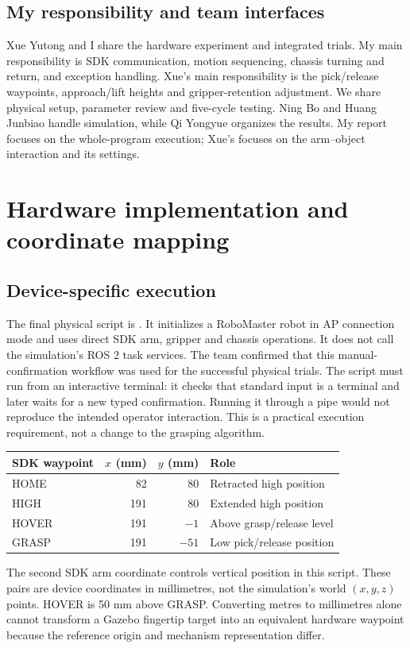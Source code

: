 
\newcommand{\studentname}{Bao Lintai}
\newcommand{\studentcn}{包林泰}
\newcommand{\studentid}{24020036004}

\commonrequirements
\subsection{My responsibility and team interfaces}
Xue Yutong and I share the hardware experiment and integrated trials. My main responsibility is SDK communication, motion sequencing, chassis turning and return, and exception handling. Xue's main responsibility is the pick/release waypoints, approach/lift heights and gripper-retention adjustment. We share physical setup, parameter review and five-cycle testing. Ning Bo and Huang Junbiao handle simulation, while Qi Yongyue organizes the results. My report focuses on the whole-program execution; Xue's focuses on the arm--object interaction and its settings.
\teamtable
\commonlimits
\clearpage
\section{Hardware implementation and coordinate mapping}
\subsection{Device-specific execution}
The final physical script is . It initializes a RoboMaster robot in AP connection mode and uses direct SDK arm, gripper and chassis operations. It does not call the simulation's ROS 2 task services. The team confirmed that this manual-confirmation workflow was used for the successful physical trials.
The script must run from an interactive terminal: it checks that standard input is a terminal and later waits for a new typed confirmation. Running it through a pipe would not reproduce the intended operator interaction. This is a practical execution requirement, not a change to the grasping algorithm.
\begin{center}
\begin{tabular}{@{}lrrl@{}}\toprule
SDK waypoint & $x$ (mm) & $y$ (mm) & Role\\\midrule
HOME & 82 & 80 & Retracted high position\\
HIGH & 191 & 80 & Extended high position\\
HOVER & 191 & $-1$ & Above grasp/release level\\
GRASP & 191 & $-51$ & Low pick/release position\\\bottomrule
\end{tabular}
\end{center}
The second SDK arm coordinate controls vertical position in this script. These pairs are device coordinates in millimetres, not the simulation's world $(x,y,z)$ points. HOVER is 50 mm above GRASP. Converting metres to millimetres alone cannot transform a Gazebo fingertip target into an equivalent hardware waypoint because the reference origin and mechanism representation differ.
